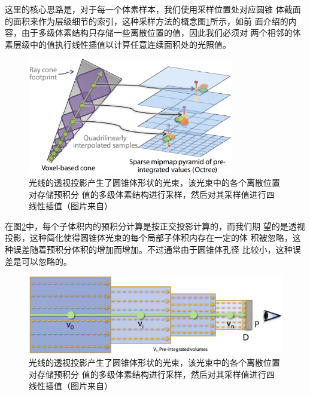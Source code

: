 这里的核心思路是，对于每一个体素样本，我们使用采样位置处对应圆锥 体截面的面积来作为层级细节的索引，这种采样方法的概念图\ref{f:vct-7-4}所示，如前 面介绍的内容，由于多级体素结构只存储一些离散位置的值，因此我们必须对 两个相邻的体素层级中的值执行线性插值以计算任意连续面积处的光照值。

\begin{figure}
\begin{center}
	\includegraphics[width=0.8\textwidth]{figures/vct/vct-7-4}
\end{center}
	\caption{光线的透视投影产生了圆锥体形状的光束，该光束中的各个离散位置对存储预积分 值的多级体素结构进行采样，然后对其采样值进行四线性插值（图片来自\cite{a:InteractiveIndirectIlluminationUsingVoxelConeTracing}）}
	\label{f:vct-7-4}
\end{figure}

在图\ref{f:vct-7-5}中，每个子体积内的预积分计算是按正交投影计算的，而我们期 望的是透视投影，这种简化使得圆锥体光束的每个局部子体积内存在一定的体 积被忽略，这种误差随着预积分体积的增加而增加。不过通常由于圆锥体孔径 比较小，这种误差是可以忽略的。

\begin{figure}
	\includegraphics[width=\textwidth]{figures/vct/vct-7-5}
	\caption{光线的透视投影产生了圆锥体形状的光束，该光束中的各个离散位置对存储预积分 值的多级体素结构进行采样，然后对其采样值进行四线性插值（图片来自\cite{a:InteractiveIndirectIlluminationUsingVoxelConeTracing}）}
	\label{f:vct-7-5}
\end{figure}



